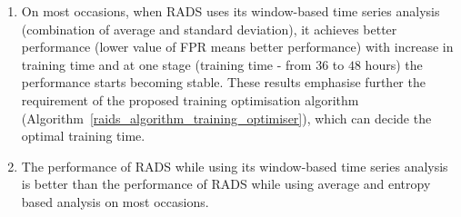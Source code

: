 \begin{enumerate}[{(a)}]
\item On most occasions, when RADS uses its window-based time series analysis (combination of average and standard deviation), it achieves better performance (lower value of FPR means better performance) with increase in training time and at one stage (training time - from $36$ to $48$ hours) the performance starts becoming stable. These results emphasise further the requirement of the proposed training optimisation algorithm (Algorithm~\ref{raids_algorithm_training_optimiser}), which can decide the optimal training time.
\item The performance of RADS while using its window-based time series analysis is better than the performance of RADS while using average and entropy based analysis on most occasions.

\end{enumerate}

